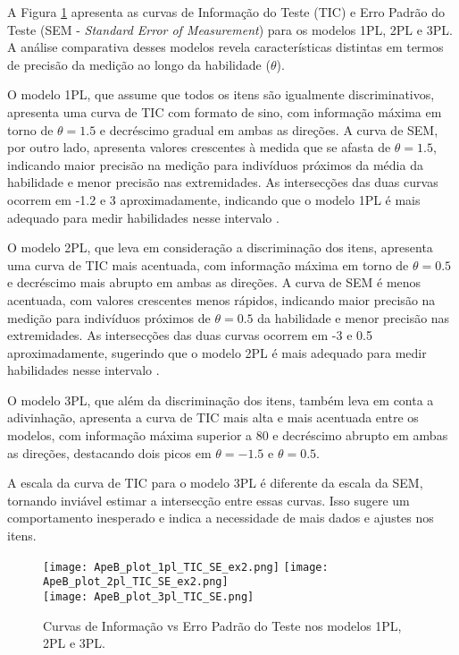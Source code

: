 A Figura \ref{fig:ApeB_plot_TIC_SE} apresenta as curvas de Informação do Teste (TIC) e Erro Padrão do Teste (SEM - \textit{Standard Error of Measurement}) para os modelos 1PL, 2PL e 3PL. A análise comparativa desses modelos revela características distintas em termos de precisão da medição ao longo da habilidade ($\theta$).

O modelo 1PL, que assume que todos os itens são igualmente discriminativos, apresenta uma curva de TIC com formato de sino, com informação máxima em torno de $\theta = 1.5$ e decréscimo gradual em ambas as direções. A curva de SEM, por outro lado, apresenta valores crescentes à medida que se afasta de $\theta = 1.5$, indicando maior precisão na medição para indivíduos próximos da média da habilidade e menor precisão nas extremidades. As intersecções das duas curvas ocorrem em -1.2 e 3 aproximadamente, indicando que o modelo 1PL é mais adequado para medir habilidades nesse intervalo \cite{baker2017basics}.

O modelo 2PL, que leva em consideração a discriminação dos itens, apresenta uma curva de TIC mais acentuada, com informação máxima em torno de $\theta = 0.5$ e decréscimo mais abrupto em ambas as direções. A curva de SEM é menos acentuada, com valores crescentes menos rápidos, indicando maior precisão na medição para indivíduos próximos de $\theta = 0.5$ da habilidade e menor precisão nas extremidades. As intersecções das duas curvas ocorrem em -3 e 0.5 aproximadamente, sugerindo que o modelo 2PL é mais adequado para medir habilidades nesse intervalo \cite{baker2017basics}.

O modelo 3PL, que além da discriminação dos itens, também leva em conta a adivinhação, apresenta a curva de TIC mais alta e mais acentuada entre os modelos, com informação máxima superior a 80 e decréscimo abrupto em ambas as direções, destacando dois picos em $\theta = -1.5$ e $\theta = 0.5$.

A escala da curva de TIC para o modelo 3PL é diferente da escala da SEM, tornando inviável estimar a intersecção entre essas curvas. Isso sugere um comportamento inesperado e indica a necessidade de mais dados e ajustes nos itens.

\begin{figure}[!ht]
    \centering
    \texttt{[image: ApeB\_plot\_1pl\_TIC\_SE\_ex2.png]}
    \texttt{[image: ApeB\_plot\_2pl\_TIC\_SE\_ex2.png]} \\ 
    \texttt{[image: ApeB\_plot\_3pl\_TIC\_SE.png]} 
    \caption{Curvas de Informação vs Erro Padrão do Teste nos modelos 1PL, 2PL e 3PL.}
    \label{fig:ApeB_plot_TIC_SE}
    \end{figure}
  
